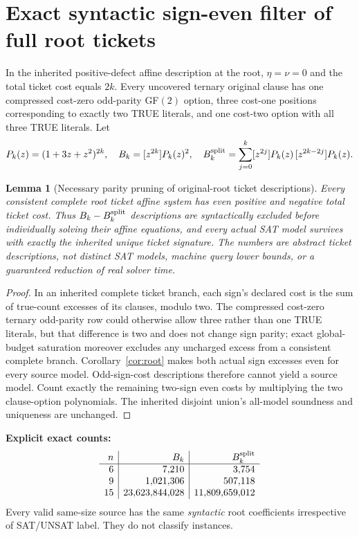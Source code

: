 \documentclass[11pt]{article}
\newtheorem{lemma}{Lemma}
\begin{document}
\section{Exact syntactic sign-even filter of full root tickets}
In the inherited positive-defect affine description at the root, $\eta=\nu=0$ and the total ticket cost equals $2k$. Every uncovered ternary original clause has one compressed cost-zero odd-parity GF$(2)$ option, three cost-one positions corresponding to exactly two TRUE literals, and one cost-two option with all three TRUE literals. Let
\[
P_k(z)=(1+3z+z^2)^{2k},\quad
B_k=[z^{2k}]P_k(z)^2,\quad
B_k^{\rm split}=\sum_{j=0}^k[z^{2j}]P_k(z)\,[z^{2k-2j}]P_k(z).
\]
\begin{lemma}[Necessary parity pruning of original-root ticket descriptions]
Every consistent complete root ticket affine system has \emph{even} positive and negative total ticket cost. Thus $B_k-B_k^{\rm split}$ descriptions are syntactically excluded \emph{before} individually solving their affine equations, and every actual SAT model survives with exactly the inherited unique ticket signature. The numbers are abstract ticket descriptions, not distinct SAT models, machine query lower bounds, or a guaranteed reduction of real solver time.
\end{lemma}
\begin{proof}
In an inherited complete ticket branch, each sign's declared cost is the sum of true-count excesses of its clauses, modulo two. The compressed cost-zero ternary odd-parity row could otherwise allow three rather than one TRUE literals, but that difference is two and does not change sign parity; exact global-budget saturation moreover excludes any uncharged excess from a consistent complete branch. Corollary~\ref{cor:root} makes both actual sign excesses even for every source model. Odd-sign-cost descriptions therefore cannot yield a source model. Count exactly the remaining two-sign even costs by multiplying the two clause-option polynomials. The inherited disjoint union's all-model soundness and uniqueness are unchanged.
\end{proof}
\noindent\textbf{Explicit exact counts:}
\[
\begin{array}{r|r|r}
 n&B_k&B_k^{\rm split}\\\hline
6&7{,}210&3{,}754\\
9&1{,}021{,}306&507{,}118\\
15&23{,}623{,}844{,}028&11{,}809{,}659{,}012
\end{array}
\]
Every valid same-size source has the same \emph{syntactic} root coefficients irrespective of SAT/UNSAT label. They do not classify instances.
\end{document}
